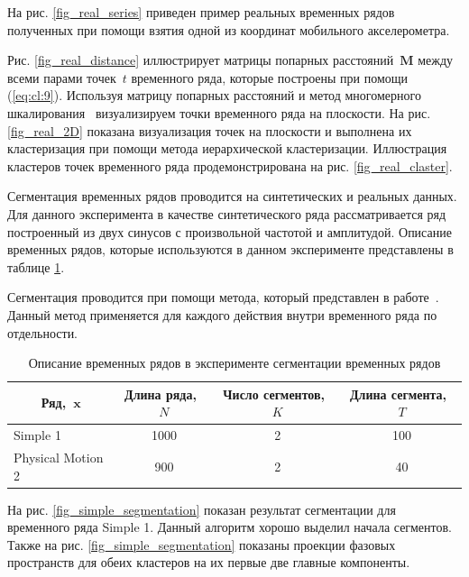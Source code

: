 На рис. \ref{fig_real_series} приведен пример реальных временных рядов полученных при помощи взятия одной из координат мобильного акселерометра. 

Рис. \ref{fig_real_distance} иллюстрирует матрицы попарных расстояний~$\textbf{M}$ между всеми парами точек~$t$ временного ряда, которые построены при помощи (\ref{eq:cl:9}). 
Используя матрицу попарных расстояний и метод многомерного шкалирования~\cite{Borg2005} визуализируем точки временного ряда на плоскости. 
На рис. \ref{fig_real_2D} показана визуализация точек на плоскости и выполнена их кластеризация при помощи метода иерархической кластеризации. 
Иллюстрация кластеров точек временного ряда продемонстрирована на рис. \ref{fig_real_claster}.

Сегментация временных рядов проводится на синтетических и реальных данных. Для данного эксперимента в качестве синтетического ряда рассматривается ряд построенный из двух синусов с произвольной частотой и амплитудой. Описание временных рядов, которые используются в данном эксперименте представлены в таблице \ref{table:3}.

Сегментация проводится при помощи метода, который представлен в работе~\cite{motrenko2015}. Данный метод применяется для каждого действия внутри временного ряда по отдельности.


\begin{table}[h!t]
\begin{center}
\caption{Описание временных рядов в эксперименте сегментации временных рядов}
\label{table:3}
\begin{tabular}{|c|c|c|c|}
\hline
	Ряд,~$\textbf{x}$ &Длина ряда,~$N$& Число сегментов,~$K$&Длина сегмента,~$T$\\
	\hline
	\multicolumn{1}{|l|}{Simple 1}
	& 1000& 2& 100\\
	\hline
	\multicolumn{1}{|l|}{Physical Motion 2}
	& 900& 2& 40\\
\hline

\end{tabular}
\end{center}
\end{table}

На рис. \ref{fig_simple_segmentation} показан результат сегментации для временного ряда Simple 1. 
Данный алгоритм хорошо выделил начала сегментов. 
Также на рис. \ref{fig_simple_segmentation} показаны проекции фазовых пространств для обеих кластеров на их первые две главные компоненты.

